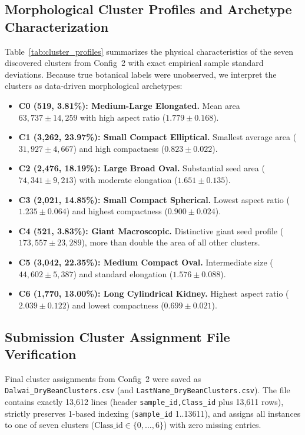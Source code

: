\documentclass[10pt,onecolumn,letterpaper]{article}
\begin{document}
\subsection{Morphological Cluster Profiles and Archetype Characterization}
Table~\ref{tab:cluster_profiles} summarizes the physical characteristics of the seven discovered clusters from Config~2 with exact empirical sample standard deviations. Because true botanical labels were unobserved, we interpret the clusters as data-driven morphological archetypes:
\begin{itemize}
  \item \textbf{C0 (519, 3.81\%): Medium-Large Elongated.} Mean area $63{,}737 \pm 14{,}259$ with high aspect ratio ($1.779 \pm 0.168$).
  \item \textbf{C1 (3,262, 23.97\%): Small Compact Elliptical.} Smallest average area ($31{,}927 \pm 4{,}667$) and high compactness ($0.823 \pm 0.022$).
  \item \textbf{C2 (2,476, 18.19\%): Large Broad Oval.} Substantial seed area ($74{,}341 \pm 9{,}213$) with moderate elongation ($1.651 \pm 0.135$).
  \item \textbf{C3 (2,021, 14.85\%): Small Compact Spherical.} Lowest aspect ratio ($1.235 \pm 0.064$) and highest compactness ($0.900 \pm 0.024$).
  \item \textbf{C4 (521, 3.83\%): Giant Macroscopic.} Distinctive giant seed profile ($173{,}557 \pm 23{,}289$), more than double the area of all other clusters.
  \item \textbf{C5 (3,042, 22.35\%): Medium Compact Oval.} Intermediate size ($44{,}602 \pm 5{,}387$) and standard elongation ($1.576 \pm 0.088$).
  \item \textbf{C6 (1,770, 13.00\%): Long Cylindrical Kidney.} Highest aspect ratio ($2.039 \pm 0.122$) and lowest compactness ($0.699 \pm 0.021$).
\end{itemize}

\subsection{Submission Cluster Assignment File Verification}
Final cluster assignments from Config~2 were saved as \texttt{Dalwai\_DryBeanClusters.csv} (and \texttt{LastName\_DryBeanClusters.csv}). The file contains exactly 13,612 lines (header \texttt{sample\_id,Class\_id} plus 13,611 rows), strictly preserves 1-based indexing (\texttt{sample\_id} 1..13611), and assigns all instances to one of seven clusters ($\text{Class\_id} \in \{0, \dots, 6\}$) with zero missing entries.
\end{document}

